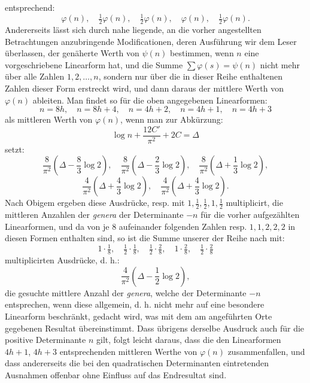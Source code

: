 \documentclass[11pt]{article}
\begin{document}
entsprechend:
\[
 \varphi(n),\quad \tfrac12\varphi(n),\quad \tfrac12\varphi(n),\quad
 \varphi(n),\quad \tfrac12\varphi(n).
\]
Andererseits lässt sich durch nahe liegende, an die vorher angestellten Betrachtungen anzubringende Modificationen, deren Ausführung wir dem Leser überlassen, der genäherte Werth von $\psi(n)$ bestimmen, wenn $n$ eine vorgeschriebene Linearform hat, und die Summe $\sum\varphi(s)=\psi(n)$ nicht mehr über alle Zahlen $1,2,\ldots,n$, sondern nur über die in dieser Reihe enthaltenen Zahlen dieser Form erstreckt wird, und dann daraus der mittlere Werth von $\varphi(n)$ ableiten. Man findet so für die oben angegebenen Linearformen:
\[
 n=8h,\quad n=8h+4,\quad n=4h+2,\quad n=4h+1,\quad n=4h+3
\]
als mittleren Werth von $\varphi(n)$, wenn man zur Abkürzung:
\[
 \log n+\frac{12C'}{\pi^2}+2C=\Delta
\]
setzt:
\[
 \frac8{\pi^2}\left(\Delta-\frac83\log2\right),\quad
 \frac8{\pi^2}\left(\Delta-\frac23\log2\right),\quad
 \frac8{\pi^2}\left(\Delta+\frac13\log2\right),
\]
\[
 \frac4{\pi^2}\left(\Delta+\frac43\log2\right),\quad
 \frac4{\pi^2}\left(\Delta+\frac43\log2\right).
\]
Nach Obigem ergeben diese Ausdrücke, resp. mit $1,\tfrac12,\tfrac12,1,\tfrac12$ multiplicirt, die mittleren Anzahlen der \emph{genera} der Determinante $-n$ für die vorher aufgezählten Linearformen, und da von je 8 aufeinander folgenden Zahlen resp. $1,1,2,2,2$ in diesen Formen enthalten sind, so ist die Summe unserer der Reihe nach mit:
\[
 1\cdot\tfrac18,\quad \tfrac12\cdot\tfrac18,\quad
 \tfrac12\cdot\tfrac28,\quad 1\cdot\tfrac28,\quad
 \tfrac12\cdot\tfrac28
\]
multiplicirten Ausdrücke, d. h.:
\[
 \frac4{\pi^2}\left(\Delta-\frac12\log2\right),
\]
die gesuchte mittlere Anzahl der \emph{genera}, welche der Determinante $-n$ entsprechen, wenn diese allgemein, d. h. nicht mehr auf eine besondere Linearform beschränkt, gedacht wird, was mit dem am angeführten Orte gegebenen Resultat übereinstimmt. Dass übrigens derselbe Ausdruck auch für die positive Determinante $n$ gilt, folgt leicht daraus, dass die den Linearformen $4h+1$, $4h+3$ entsprechenden mittleren Werthe von $\varphi(n)$ zusammenfallen, und dass andererseits die bei den quadratischen Determinanten eintretenden Ausnahmen offenbar ohne Einfluss auf das Endresultat sind.
\end{document}
